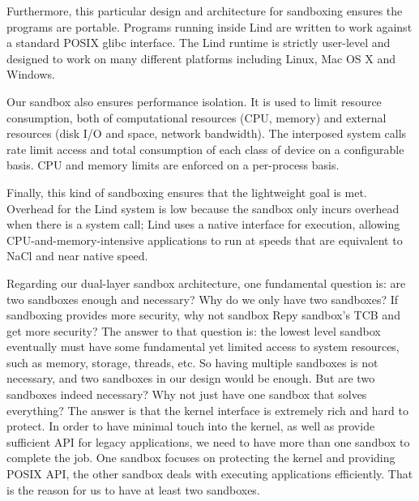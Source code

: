 Furthermore, this particular design and architecture for sandboxing ensures the programs are portable. 
Programs running inside Lind are written to work against a standard POSIX glibc interface. 
The Lind runtime is strictly user-level and designed to work on many different platforms including Linux, 
Mac OS X and Windows.

Our sandbox also ensures performance isolation. It is used to limit resource consumption, 
both of computational resources (CPU, memory) and external resources (disk I/O and space, 
network bandwidth). The interposed system calls rate limit access and total consumption of 
each class of device on a configurable basis. CPU and memory limits are enforced on 
a per-process basis. 

Finally, this kind of sandboxing ensures that the lightweight goal is met. Overhead for the Lind system 
is low because the sandbox only incurs overhead when there is a system call; Lind uses a native interface 
for execution, allowing CPU-and-memory-intensive applications to run at speeds that are equivalent 
to NaCl and near native speed. 

Regarding our dual-layer sandbox architecture, one fundamental question is: are two sandboxes 
enough and necessary? Why do we only have two sandboxes? If sandboxing provides more security, 
why not sandbox Repy sandbox's TCB and get more security? The answer to that question is: 
the lowest level sandbox eventually must have some fundamental yet limited access to system resources, 
such as memory, storage, threads, etc. So having multiple sandboxes is not necessary, and two sandboxes in 
our design would be enough. But are two sandboxes indeed necessary? Why not just have one sandbox 
that solves everything? The answer is that the kernel interface is extremely rich and hard to protect. 
In order to have minimal touch into the kernel, as well as provide sufficient API for legacy applications, 
we need to have more than one sandbox to complete the job. One sandbox focuses on protecting 
the kernel and providing POSIX API, the other sandbox deals with executing applications efficiently. 
That is the reason for us to have at least two sandboxes.  
